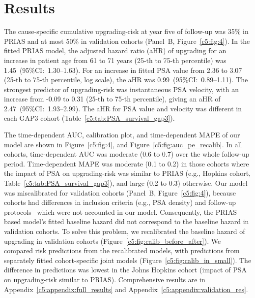 \section{Results}
The cause-specific cumulative upgrading-risk at year five of follow-up was 35\% in PRIAS and at most 50\% in validation cohorts (Panel~B, Figure~\ref{c5:fig:4}). In the fitted PRIAS model, the adjusted hazard ratio (aHR) of upgrading for an increase in patient age from 61 to 71 years (25-th to 75-th percentile) was 1.45~(95\%CI:~1.30--1.63). For an increase in fitted PSA value from 2.36 to 3.07 (25-th to 75-th percentile, log scale), the aHR was 0.99~(95\%CI:~0.89--1.11). The strongest predictor of upgrading-risk was instantaneous PSA velocity, with an increase from -0.09 to 0.31 (25-th to 75-th percentile), giving an aHR of 2.47~(95\%CI:~1.93--2.99). The aHR for PSA value and velocity was different in each GAP3 cohort (Table~\ref{c5:tab:PSA_survival_gap3}).

The time-dependent AUC, calibration plot, and time-dependent MAPE of our model are shown in Figure~\ref{c5:fig:4}, and Figure~\ref{c5:fig:auc_pe_recalib}. In all cohorts, time-dependent AUC was moderate (0.6 to 0.7) over the whole follow-up period. Time-dependent MAPE was moderate (0.1 to 0.2) in those cohorts where the impact of PSA on upgrading-risk was similar to PRIAS (e.g., Hopkins cohort, Table~\ref{c5:tab:PSA_survival_gap3}), and large (0.2 to 0.3) otherwise. Our model was miscalibrated for validation cohorts (Panel~B, Figure~\ref{c5:fig:4}), because cohorts had differences in inclusion criteria (e.g., PSA density) and follow-up protocols~\citep{gap3_2018} which were not accounted in our model. Consequently, the PRIAS based model's fitted baseline hazard did not correspond to the baseline hazard in validation cohorts. To solve this problem, we recalibrated the baseline hazard of upgrading in validation cohorts (Figure~\ref{c5:fig:calib_before_after}). We compared risk predictions from the recalibrated models, with predictions from separately fitted cohort-specific joint models (Figure~\ref{c5:fig:calib_in_small}). The difference in predictions was lowest in the Johns Hopkins cohort (impact of PSA on upgrading-risk similar to PRIAS). Comprehensive results are in Appendix~\ref{c5:appendix:full_results} and Appendix~\ref{c5:appendix:validation_res}.

